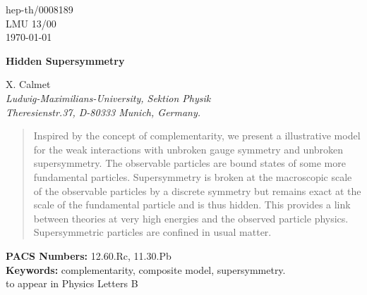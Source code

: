 \documentclass[a4paper,12pt]{article}
\begin{document}
\makeatletter
\def\fmslash{\@ifnextchar[{\fmsl@sh}{\fmsl@sh[0mu]}}
\def\fmsl@sh[#1]#2{%
  \mathchoice
    {\@fmsl@sh\displaystyle{#1}{#2}}%
    {\@fmsl@sh\textstyle{#1}{#2}}%
    {\@fmsl@sh\scriptstyle{#1}{#2}}%
    {\@fmsl@sh\scriptscriptstyle{#1}{#2}}}
\def\@fmsl@sh#1#2#3{\m@th\ooalign{$\hfil#1\mkern#2/\hfil$\crcr$#1#3$}}
\makeatother
\thispagestyle{empty}
\begin{titlepage}

\begin{flushright}
hep-th/0008189 \\
LMU 13/00\\
\today
\end{flushright}

\vspace{0.3cm}
\boldmath
\begin{center}
\Large\bf Hidden Supersymmetry
\end{center}
\unboldmath
\vspace{0.8cm}

\begin{center}
  {\large X. Calmet} \\
  {\sl Ludwig-Maximilians-University, Sektion Physik} \\
  {\sl Theresienstr.37, D-80333 Munich, Germany.}
\end{center}


\vspace{\fill}

\begin{abstract}
\noindent
Inspired by the concept of complementarity, we present a illustrative
model for the weak interactions with unbroken gauge symmetry and
unbroken supersymmetry.  The observable particles are bound states of
some more fundamental particles. Supersymmetry is broken at the
macroscopic scale of the observable particles by a discrete symmetry
but remains exact at the scale of the fundamental particle and is thus
hidden.  This provides a link between theories at very high energies
and the observed particle physics. Supersymmetric particles are
confined in usual matter.
\end{abstract}
{\bf PACS Numbers: } 12.60.Rc, 11.30.Pb \\ 
{\bf Keywords: } complementarity, composite model, supersymmetry. \\
to appear in Physics Letters B 
\end{titlepage}
\end{document}
